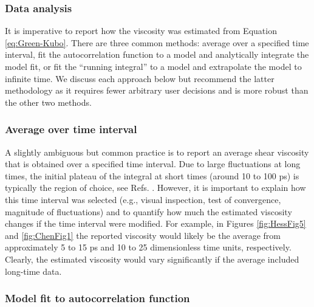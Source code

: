 \documentclass[9pt,bestpractices]{livecoms}
\begin{document}

\subsubsection{Data analysis} \label{sec:Viscosity:Green-Kubo: Data analysis}

It is imperative to report how the viscosity was estimated from Equation \ref{eq:Green-Kubo}. There are three common methods: average over a specified time interval, fit the autocorrelation function to a model and analytically integrate the model fit, or fit the ``running integral'' to a model and extrapolate the model to infinite time. We discuss each approach below but recommend the latter methodology as it requires fewer arbitrary user decisions and is more robust than the other two methods.

\subsubsection*{Average over time interval}

A slightly ambiguous but common practice is to report an average shear viscosity that is obtained over a specified time interval. Due to large fluctuations at long times, the initial plateau of the integral at short times (around 10 to 100 ps) is typically the region of choice, see Refs. \cite{Fanourgakis2012,Chen2009}. However, it is important to explain how this time interval was selected (e.g., visual inspection, test of convergence, magnitude of fluctuations) and to quantify how much the estimated viscosity changes if the time interval were modified. For example, in Figures \ref{fig:HessFig5} and \ref{fig:ChenFig1} the reported viscosity would likely be the average from approximately 5 to 15 ps and 10 to 25 dimensionless time units, respectively. Clearly, the estimated viscosity would vary significantly if the average included long-time data. 

\subsubsection*{Model fit to autocorrelation function}
\end{document}
